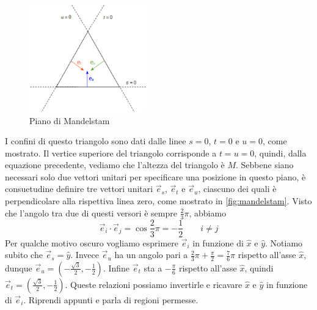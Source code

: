 \begin{itemize}
        \begin{figure}[h]
            \centering
            \includegraphics[width=0.45\textwidth]{immagini/fig_mandelstam.png}
            \caption{Piano di Mandelstam}%
            \label{fig:mandelstam}
          \end{figure}
          I confini di questo triangolo sono dati dalle linee \( s = 0 \), \( t = 0 \) e \( u = 0 \), come mostrato. Il vertice superiore del triangolo corrisponde a \( t = u = 0 \), quindi, dalla equazione precedente, vediamo che l'altezza del triangolo è \( M \). Sebbene siano necessari solo due vettori unitari per specificare una posizione in questo piano, è consuetudine definire tre vettori unitari \( \vec{e}_s \), \( \vec{e}_t \) e \( \vec{e}_u \), ciascuno dei quali è perpendicolare alla rispettiva linea zero, come mostrato in \autoref{fig:mandelstam}. Visto che l'angolo tra due di questi versori è sempre $\frac23\pi$, abbiamo 
          \begin{equation*}
          \vec{e}_i\cdot\vec{e}_j=\cos\frac23\pi=-\frac12 \qquad i\neq j
          \end{equation*}
          Per qualche motivo oscuro vogliamo esprimere ${\vec e_i}$ in funzione di $\hat x$ e $\hat y$. Notiamo subito che $\vec e_s=\hat y$. Invece $\vec e_u$ ha un angolo pari a $\frac23\pi+\frac\pi2=\frac76\pi$ rispetto all'asse $\hat x$, dunque $\vec e_u=(-\frac{\sqrt3} 2,-\frac12)$. Infine $\vec e_t$ sta a $-\frac\pi6$ rispetto all'asse $\hat x$, quindi $\vec e_t=(\frac{\sqrt3}2,-\frac12)$. Queste relazioni possiamo invertirle e ricavare $\hat x$ e $\hat y$ in funzione di $\vec e_i$. Riprendi appunti e parla di regioni permesse.
\end{itemize}